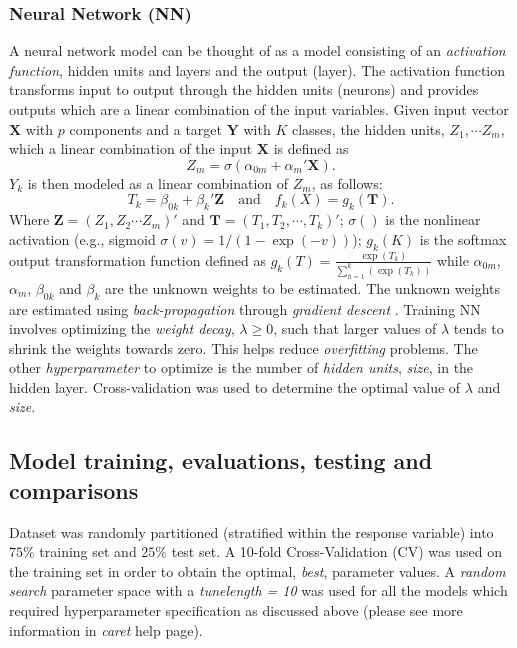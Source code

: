\subsubsection{Neural Network (NN)}
\noindent A neural network model can be thought of as a model consisting of an \textit{activation function}, hidden units and layers and the output (layer). The activation function transforms input to output through the hidden units (neurons) and provides outputs which are a linear combination of the input variables.
\noindent Given input vector $\mathbf{X}$ with $p$ components and a target $\mathbf{Y}$ with $K$ classes, the hidden units, $Z_1, \cdots Z_m$, which a linear combination of the input $\mathbf{X}$ is defined as $$Z_m = \sigma(\alpha_{0m} + \alpha_m'\mathbf{X}).$$ $Y_k$ is then modeled as a linear combination of $Z_m$, as follows: $$T_k = \beta_{0k} + \beta_k'\mathbf{Z} \quad \text{and} \quad f_k(X) = g_k(\mathbf{T}).$$ Where $\mathbf{Z} = (Z_1, Z_2 \cdots Z_m)'$ and $\mathbf{T} = (T_1, T_2, \cdots, T_k)'$; $\sigma()$ is the nonlinear activation (e.g., sigmoid $\sigma(v) = 1/(1-\exp(-v))$); $g_k(K)$ is the softmax output transformation function defined as $g_k(T) = \frac{\exp(T_k)}{\sum_{h=1}^k(\exp(T_k))}$ while $\alpha_{0m}$, $\alpha_m$, $\beta_{0k}$ and $\beta_k$ are the unknown weights to be estimated. The unknown weights are estimated using \textit{back-propagation} through \textit{gradient descent} \cite{trevor2009elements}. Training NN involves optimizing the \textit{weight decay}, $\lambda\geq0$, such that larger values of $\lambda$ tends to shrink the weights towards zero. This helps reduce \textit{overfitting} problems. The other \textit{hyperparameter} to optimize is the number of \textit{hidden units}, \textit{size}, in the hidden layer. Cross-validation was used to determine the optimal value of $\lambda$ and \textit{size}.

\subsection{Model training, evaluations, testing and comparisons}

Dataset was randomly partitioned (stratified within the response variable) into $75\%$ training set and $25\%$ test set. A 10-fold Cross-Validation (CV) was used on the training set in order to obtain the optimal, \textit{best}, parameter values. A \textit{random search} parameter space with a \textit{tunelength = 10} was used for all the models which required hyperparameter specification as discussed above (please see more information in \textit{caret} help page). \\

